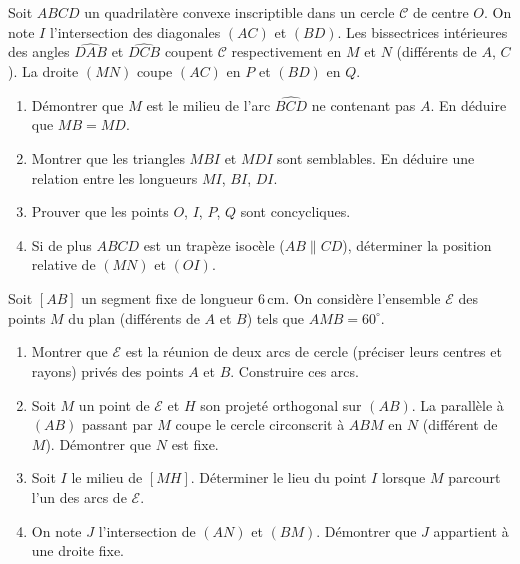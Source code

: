 \documentclass[11pt]{article}
\begin{document}
\begin{exercice}
Soit $ABCD$ un quadrilatère convexe inscriptible dans un cercle $\mathcal{C}$ de centre $O$. On note $I$ l'intersection des diagonales $(AC)$ et $(BD)$. Les bissectrices intérieures des angles $\widehat{DAB}$ et $\widehat{DCB}$ coupent $\mathcal{C}$ respectivement en $M$ et $N$ (différents de $A$, $C$). La droite $(MN)$ coupe $(AC)$ en $P$ et $(BD)$ en $Q$.
\begin{enumerate}
    \item Démontrer que $M$ est le milieu de l'arc $\widehat{BCD}$ ne contenant pas $A$. En déduire que $MB = MD$.
    \item Montrer que les triangles $MBI$ et $MDI$ sont semblables. En déduire une relation entre les longueurs $MI$, $BI$, $DI$.
    \item Prouver que les points $O$, $I$, $P$, $Q$ sont concycliques.
    \item Si de plus $ABCD$ est un trapèze isocèle ($AB \parallel CD$), déterminer la position relative de $(MN)$ et $(OI)$.
\end{enumerate}
\end{exercice}

\begin{exercice}
Soit $[AB]$ un segment fixe de longueur $6\,\text{cm}$. On considère l'ensemble $\mathcal{E}$ des points $M$ du plan (différents de $A$ et $B$) tels que $\widehat{AMB} = 60^\circ$.
\begin{enumerate}
    \item Montrer que $\mathcal{E}$ est la réunion de deux arcs de cercle (préciser leurs centres et rayons) privés des points $A$ et $B$. Construire ces arcs.
    \item Soit $M$ un point de $\mathcal{E}$ et $H$ son projeté orthogonal sur $(AB)$. La parallèle à $(AB)$ passant par $M$ coupe le cercle circonscrit à $ABM$ en $N$ (différent de $M$). Démontrer que $N$ est fixe.
    \item Soit $I$ le milieu de $[MH]$. Déterminer le lieu du point $I$ lorsque $M$ parcourt l'un des arcs de $\mathcal{E}$.
    \item On note $J$ l'intersection de $(AN)$ et $(BM)$. Démontrer que $J$ appartient à une droite fixe.
\end{enumerate}
\end{exercice}
\end{document}
